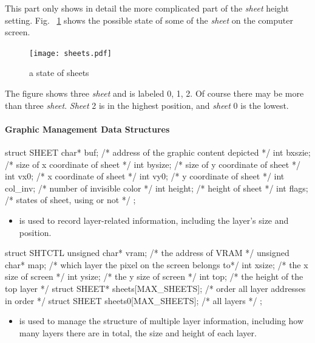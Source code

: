 \documentclass{swfcthesis}
\begin{document}
This part only shows in detail the more complicated part of the \emph{sheet} height
setting. Fig. ~\ref{fig:state-sheets} shows the possible state of some of the \emph{sheet}
on the computer screen.
\begin{figure}[!ht]
  \centering
  \texttt{[image: sheets.pdf]}
  \caption{a state of sheets}
  \label{fig:state-sheets}
\end{figure}
The figure shows three \emph{sheet} and is labeled 0, 1, 2. Of course there may be more
than three \emph{sheet}. \emph{Sheet} 2 is in the highest position, and \emph{sheet} 0 is
the lowest.


  
\paragraph{Graphic Management Data Structures}

\begin{codeblock}[1]
\begin{ccode}
struct SHEET
{ 
  char* buf;   /* address of the graphic content depicted */
  int bxszie;  /* size of x coordinate of sheet */
  int bysize;  /* size of y coordinate of sheet */
  int vx0;     /* x coordinate of sheet */
  int vy0;     /* y coordinate of sheet */
  int col_inv; /* number of invisible color */
  int height;  /* height of sheet */
  int flags;   /* states of sheet, using or not */
};
\end{ccode}
\end{codeblock}
\begin{itemize}
\item is used to record layer-related information, including the layer's size and
  position.
\end{itemize}

\begin{codeblock}[1]
\begin{ccode}
struct SHTCTL
{ 
  unsigned char* vram; /* the address of VRAM */
  unsigned char* map;  /* which layer the pixel on the screen belongs to*/
  int xsize; /* the x size of screen */
  int ysize; /* the y size of screen */
  int top;   /* the height of the top layer */
  struct SHEET* sheets[MAX_SHEETS]; /* order all layer addresses in order */
  struct SHEET sheets0[MAX_SHEETS]; /* all layers */
};
\end{ccode}
\end{codeblock}
\begin{itemize}
\item is used to manage the structure of multiple layer information, including how many
  layers there are in total, the size and height of each layer.
\end{itemize}
\end{document}
